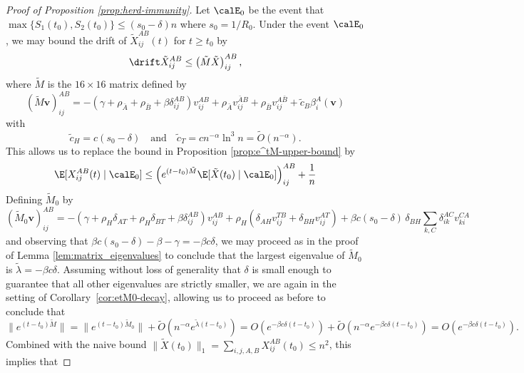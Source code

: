 \documentclass[11pt]{article}
\begin{document}
\begin{proof}[Proof of  Proposition \ref{prop:herd-immunity}]
    Let $\calE_0$ be the event that $\max\{S_1(t_0), S_2(t_0)\} \leq (s_0 - \delta)n$ where  $s_0=1/ R_0$. Under the event $\calE_0$, we may bound the drift of $\tilde X_{ij}^{AB}(t)$ for $t\geq t_0$ 
by 
\begin{equation}\label{tilde-X-drift-upper-bound-hi}
\drift \tilde X_{ij}^{AB}\leq
\left(\tilde M \tilde X\right)_{ij}^{AB},
\end{equation}
 where $\tilde M$ is the $16 \times 16$ matrix defined by
    \begin{equation}\label{tilde-M-def}
    (\tilde M\mathbf v)_{ij}^{AB}=
    -\left(\gamma+\rho_{\bar A}+\rho_{\bar B}+\beta \delta_{ij}^{AB}\right) v_{ij}^{AB}
    +\rho_{\bar A}v_{ij}^{\bar A B}+\rho_{\bar B}v_{ij}^{A\bar B}
    +\tilde c_B\beta_i^A (\mathbf v)      
    \end{equation}
    with   \begin{equation}
    \tilde c_H=c(s_0 - \delta)\quad\text{and}\quad \tilde c_T=c n^{-\alpha}\ln^3n=\tilde O(n^{-\alpha}).
    \end{equation}
This allows us to
replace the bound in Proposition \ref{prop:e^tM-upper-bound} by
    \[
        \E[X_{ij}^{AB}(t)\mid\calE_0]\leq\left(e^{(t-t_0)\tilde M}\E[\tilde X(t_0)\mid\calE_0]\right)_{ij}^{AB} +\frac 1n
    \]
Defining $\tilde M_0$ by
\begin{equation}\label{tilde-M0-def}
(\tilde M_0 \mathbf v)_{ij}^{AB}=
 -\left(\gamma+\rho_H\delta_{AT}+\rho_H\delta_{BT}+\beta \delta_{ij}^{AB}\right)v_{ij}^{AB}
+\rho_H\left(\delta_{AH}v_{ij}^{T B}+\delta_{BH}v_{ij}^{AT}\right)
+\beta c(s_0-\delta) \,\delta_{BH}\sum_{k,C}\delta_{ik}^{AC}v_{ki}^{CA}
\end{equation}
and observing that $\beta c(s_0-\delta)-\beta-\gamma=-\beta c\delta$, we may proceed as in the proof of
Lemma \ref{lem:matrix_eigenvalues} to conclude that  the largest eigenvalue of $\tilde M_0$ is $\tilde \lambda = -\beta c \delta$. Assuming without loss of generality that $\delta$ is small enough to guarantee that all other eigenvalues are strictly smaller, we are again in the setting of
Corollary~\ref{cor:etM0-decay}, allowing us to proceed as before to conclude that
\[
\|e^{(t-t_0)\tilde M}\|=
\|e^{(t-t_0)\tilde M_0}\|+\tilde O(n^{-\alpha}e^{\tilde\lambda(t-t_0)})=
O(e^{-\beta c\delta(t-t_0)})+\tilde O(n^{-\alpha}e^{-\beta c\delta (t-t_0)})=O(e^{-\beta c\delta(t-t_0)}).
\]
Combined with the naive bound  $\|\tilde X(t_0)\|_1=\sum_{i, j, A, B} X_{ij}^{AB}(t_0) \leq  n^2$, this implies that

\end{proof}
\end{document}
